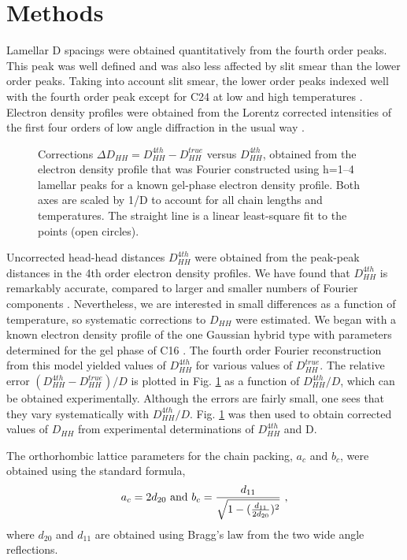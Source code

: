 \section{Methods}

Lamellar D spacings were obtained quantitatively from the fourth order
peaks.  This peak was well defined and was also less affected by slit
smear than the lower order peaks.  Taking into account slit smear,
the lower order peaks indexed well with the fourth order peak except
for C24 at low and high temperatures \cite{Sun95}.
Electron density profiles were obtained from the Lorentz corrected intensities
of the first four orders of low angle diffraction in the usual way 
\cite{WSN89}.

\begin{figure}[h]
\centerline {}
\caption{Corrections $\Delta D_{HH} = D^{4th}_{HH} - D^{true}_{HH}$ 
versus $D^{4th}_{HH}$, obtained from the electron density
profile that was  Fourier constructed using h=1--4 lamellar peaks for a 
known gel-phase electron density profile. Both axes are scaled by 1/D
to account for all chain lengths and temperatures.
The straight line is a linear least-square fit to the points (open circles).
\label{gel_cor}}
\end{figure}

Uncorrected head-head distances $D_{HH}^{4th}$ were obtained from the peak-peak
distances in the 4th order electron density profiles.  We have found that
$D_{HH}^{4th}$ is remarkably accurate, compared to larger and smaller
numbers of Fourier components \cite{N96}. Nevertheless,
we are interested in small differences as a function of temperature,
so systematic corrections to $D_{HH}$ were estimated.  We began with
a known electron density profile of the one Gaussian hybrid type with
parameters determined for the gel phase of C16 \cite{WSN89}.
The fourth order Fourier reconstruction from this model yielded values of 
$D_{HH}^{4th}$ for various values of $D_{HH}^{true}$.
The relative error $(D_{HH}^{4th} - D_{HH}^{true})/D$ is plotted in Fig. 
\ref{gel_cor} as a
function of $D^{4th}_{HH}/D$, which can be obtained experimentally.  
Although the
errors are fairly small, one sees that they vary systematically with 
$D^{4th}_{HH}/D$.
Fig. \ref{gel_cor} was then used to obtain corrected values of $D_{HH}$ from
experimental determinations of $D_{HH}^{4th}$ and D.

The orthorhombic lattice parameters for the chain packing, $a_c$ 
and $b_c$, were 
obtained using the standard formula,
\begin{eqnarray}
\label{gel_lattice}
a_c = 2 d_{20}\ \mbox{and}\ b_c = {d_{11} \over 
\sqrt{1-({d_{11} \over 2 d_{20}})^2}}\ ,
\end{eqnarray}
where $d_{20}$ and $d_{11}$ are obtained using Bragg's law from the two wide
angle reflections.

